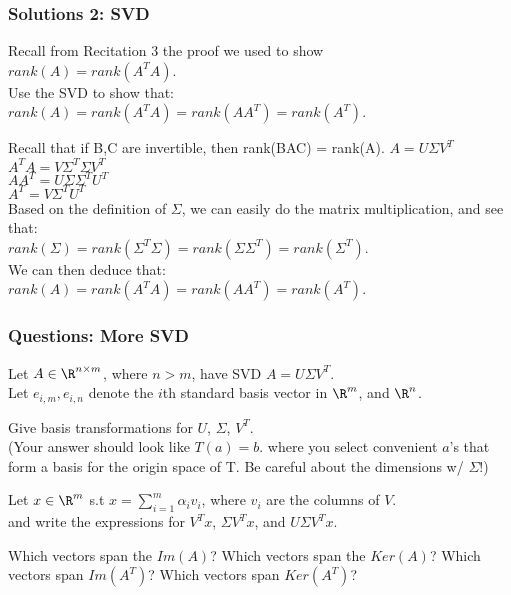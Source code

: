 \documentclass{beamer}
\renewenvironment{enumerate}%
{\begin{list}{\arabic{enumi}.}%
      {\setlength{\leftmargin}{2.5em}%
       \setlength{\itemsep}{-\parsep}%
       \setlength{\topsep}{-\parskip}%
       \usecounter{enumi}}%
 }{\end{list}}
\begin{document}
\begin{frame}
\frametitle{Solutions 2: SVD}
\begin{enumerate}
\item[2.] Recall from Recitation 3 the proof we used to show\\
\qquad $rank(A) = rank(A^TA)$.\\
Use the SVD to show that:\\
\qquad $rank(A)=rank(A^TA)=rank(AA^T)=rank(A^T)$.
\begin{solution}
Recall that if B,C are invertible, then rank(BAC) = rank(A).
$A = U\Sigma V^T$ \\
$A^TA = V\Sigma^T \Sigma V^T$ \\
$AA^T = U\Sigma \Sigma^T U^T$ \\
$A^T = V\Sigma^T U^T$ \\
Based on the definition of $\Sigma$, we can easily do the matrix multiplication, and see
that:\\
\qquad $rank(\Sigma)=rank(\Sigma^T\Sigma)=rank(\Sigma\Sigma^T)=rank(\Sigma^T)$.\\
We can then deduce that:\\
\qquad $rank(A)=rank(A^TA)=rank(AA^T)=rank(A^T)$.
\end{solution}
\end{enumerate}
\end{frame}


\begin{frame}
\frametitle{Questions: More SVD}
Let $A\in \R^{n\times m}$, where $n>m$, have SVD $A=U\Sigma V^T$.\\ 
Let $e_{i,m}, e_{i,n}$ denote the $i$th standard basis vector in $\R^m$, and $\R^n$.\begin{enumerate}

\item Give basis transformations for $U$, $\Sigma$, $V^T$.\\
(Your answer should look like $T(a) = b$. where you select convenient $a$'s that form a basis for the origin space of T.  Be careful about the dimensions w/ $\Sigma$!)

\medskip
\item Let $x\in \R^m$ s.t $x = \sum_{i=1}^m\alpha_i v_i$, where $v_i$ are the columns of $V$.\\
 and write the expressions for $V^Tx$, $\Sigma V^Tx$, and $U\Sigma V^Tx$.
\medskip
\item Which vectors span the $Im(A)$? Which vectors span the $Ker(A)$? Which vectors span $Im(A^T)$? Which vectors span $Ker(A^T)$?
\end{enumerate}
\end{frame}
\end{document}
